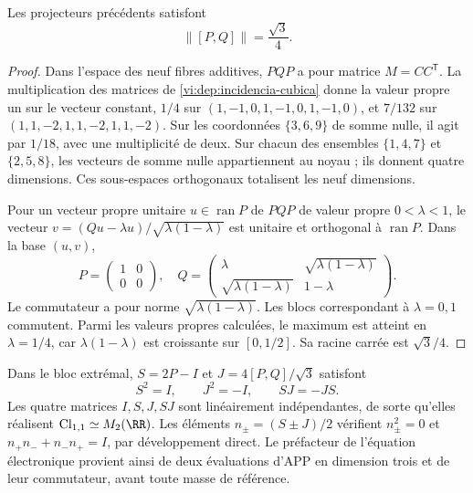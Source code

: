 \begin{proposition}
\label{vi:dep:norma-PQ}
Les projecteurs précédents satisfont
\begin{equation}
 \|[P,Q]\|=\frac{\sqrt3}{4}.
 \label{vi:dep:prefactor-valor}
\end{equation}
\end{proposition}
\begin{proof}
Dans l’espace des neuf fibres additives, \(PQP\) a pour matrice
\(M=CC^{\mathsf T}\). La multiplication des matrices de
\eqref{vi:dep:incidencia-cubica} donne la valeur propre un sur le vecteur
constant, \(1/4\) sur \((1,-1,0,1,-1,0,1,-1,0)\), et
\(7/132\) sur \((1,1,-2,1,1,-2,1,1,-2)\).
Sur les coordonnées \(\{3,6,9\}\) de somme nulle, il agit par
\(1/18\), avec une multiplicité de deux. Sur chacun des ensembles
\(\{1,4,7\}\) et \(\{2,5,8\}\), les vecteurs de somme nulle
appartiennent au noyau ; ils donnent quatre dimensions. Ces sous-espaces
orthogonaux totalisent les neuf dimensions.

Pour un vecteur propre unitaire \(u\in\operatorname{ran}P\) de
\(PQP\) de valeur propre \(0<\lambda<1\), le vecteur
\(v=(Qu-\lambda u)/\sqrt{\lambda(1-\lambda)}\) est unitaire et
orthogonal à \(\operatorname{ran}P\). Dans la base \((u,v)\),
\[
 P=\begin{pmatrix}1&0\\0&0\end{pmatrix},\quad
 Q=\begin{pmatrix}\lambda&\sqrt{\lambda(1-\lambda)}\\
 \sqrt{\lambda(1-\lambda)}&1-\lambda\end{pmatrix}.
\]
Le commutateur a pour norme \(\sqrt{\lambda(1-\lambda)}\).
Les blocs correspondant à \(\lambda=0,1\) commutent. Parmi les
valeurs propres calculées, le maximum est atteint en \(\lambda=1/4\),
car \(\lambda(1-\lambda)\) est croissante sur \([0,1/2]\).
Sa racine carrée est \(\sqrt3/4\).
\end{proof}

Dans le bloc extrémal, \(S=2P-I\) et
\(J=4[P,Q]/\sqrt3\) satisfont
\[
 S^2=I,\qquad J^2=-I,\qquad SJ=-JS.
\]
Les quatre matrices \(I,S,J,SJ\) sont linéairement indépendantes,
de sorte qu’elles réalisent \(\mathrm{Cl}_{1,1}\simeq M_2(\RR)\).
Les éléments \(n_\pm=(S\pm J)/2\) vérifient
\(n_\pm^2=0\) et \(n_+n_-+n_-n_+=I\), par développement direct.
Le préfacteur de l’équation électronique provient ainsi de deux évaluations
d’APP en dimension trois et de leur commutateur, avant toute masse
de référence.

